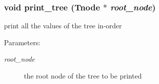 \subsubsection{\setlength{\rightskip}{0pt plus 5cm}void print\_\-tree (\bf{Tnode} $\ast$ {\em root\_\-node})}\label{tnode_8h_3554e5c7749b8d9de1f028016358c454}


print all the values of the tree in-order \begin{Desc}
\item[Parameters:]
\begin{description}
\item[{\em root\_\-node}]the root node of the tree to be printed \end{description}
\end{Desc}
